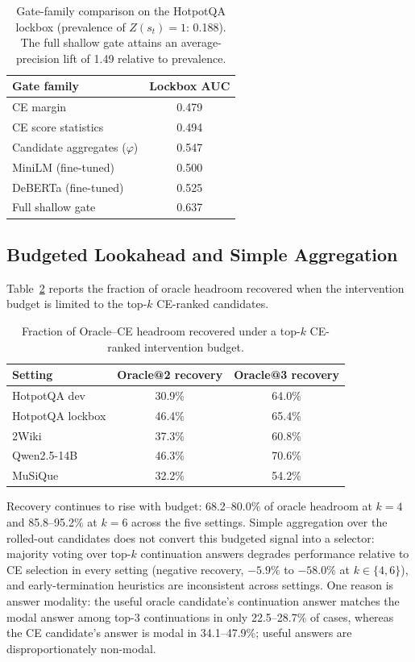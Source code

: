 \documentclass[10pt]{article}
\begin{document}
\begin{table}[h]
\centering
\small
\caption{Gate-family comparison on the HotpotQA lockbox (prevalence of
$Z(s_t)=1$: 0.188). The full shallow gate attains an average-precision lift
of 1.49 relative to prevalence.}
\label{tab:gatefamily}
\begin{tabular}{lc}
\toprule
\textbf{Gate family} & \textbf{Lockbox AUC} \\
\midrule
CE margin                    & 0.479 \\
CE score statistics          & 0.494 \\
Candidate aggregates ($\varphi$) & 0.547 \\
MiniLM (fine-tuned)          & 0.500 \\
DeBERTa (fine-tuned)         & 0.525 \\
Full shallow gate            & 0.637 \\
\bottomrule
\end{tabular}
\end{table}

\subsection{Budgeted Lookahead and Simple Aggregation}
\label{sec:lookahead}

Table~\ref{tab:lookahead} reports the fraction of oracle headroom recovered
when the intervention budget is limited to the top-$k$ CE-ranked candidates.

\begin{table}[h]
\centering
\small
\caption{Fraction of Oracle--CE headroom recovered under a top-$k$
CE-ranked intervention budget.}
\label{tab:lookahead}
\begin{tabular}{lcc}
\toprule
\textbf{Setting} & \textbf{Oracle@2 recovery} & \textbf{Oracle@3 recovery} \\
\midrule
HotpotQA dev     & 30.9\% & 64.0\% \\
HotpotQA lockbox & 46.4\% & 65.4\% \\
2Wiki            & 37.3\% & 60.8\% \\
Qwen2.5-14B      & 46.3\% & 70.6\% \\
MuSiQue          & 32.2\% & 54.2\% \\
\bottomrule
\end{tabular}
\end{table}

\noindent
Recovery continues to rise with budget: 68.2--80.0\% of oracle headroom at
$k=4$ and 85.8--95.2\% at $k=6$ across the five settings. Simple aggregation
over the rolled-out candidates does not convert this budgeted signal into a
selector: majority voting over top-$k$ continuation answers degrades
performance relative to CE selection in every setting (negative recovery,
$-5.9\%$ to $-58.0\%$ at $k\in\{4,6\}$), and early-termination heuristics are
inconsistent across settings. One reason is answer modality: the useful
oracle candidate's continuation answer matches the modal answer among top-3
continuations in only 22.5--28.7\% of cases, whereas the CE candidate's
answer is modal in 34.1--47.9\%; useful answers are disproportionately
non-modal.
\end{document}
